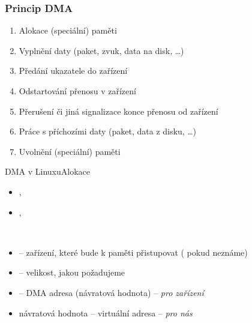 \begin{frame}
  \frametitle{Princip DMA}

  \begin{enumerate}
  \item Alokace (speciální) paměti
  \item<1> Vyplnění daty (paket, zvuk, data na disk, \dots)
  \item Předání ukazatele do zařízení
  \item Odstartování přenosu v zařízení
  \item Přerušení či jiná signalizace konce přenosu od zařízení
  \item<2> Práce s příchozími daty (paket, data z disku, \dots)
  \item Uvolnění (speciální) paměti
  \end{enumerate}

\end{frame}

\begin{frame}{DMA v Linuxu}{Alokace}

  \begin{itemize}
  \item {}, 
  \item {}, 
  \end{itemize}

  \pause
  \bigskip

  \footnotesize{}\\[-0.3em]
  \begin{itemize}
  \item {} -- zařízení, které bude k paměti přistupovat
    ( pokud neznáme)
  \item {} -- velikost, jakou požadujeme
  \item {} -- DMA adresa (návratová hodnota) -- \emph{pro zařízení}
  \item návratová hodnota -- virtuální adresa -- \emph{pro nás}
  \end{itemize}

\end{frame}


